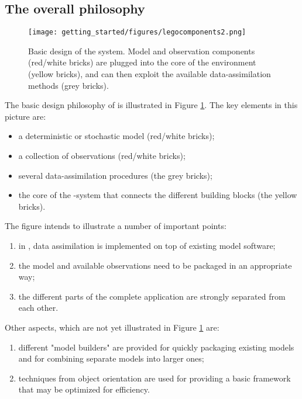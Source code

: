 \subsection{The overall philosophy}

\begin{figure}[ht]
\center
\texttt{[image: getting\_started/figures/legocomponents2.png]}
\caption{Basic design of the \oda system. Model and observation components (red/white bricks) are plugged into the core of the \oda environment (yellow bricks), and can then exploit the available data-assimilation methods (grey bricks).}
\label{fig:legoblocks}
\end{figure}

The basic design philosophy of \oda is illustrated in Figure \ref{fig:legoblocks}. The key elements in this picture are:

\begin{itemize}
\item a deterministic or stochastic model (red/white bricks);
\item a collection of observations (red/white bricks);
\item several data-assimilation procedures (the grey bricks);
\item the core of the \oda-system that connects the different building blocks (the yellow bricks).
\end{itemize}

The figure intends to illustrate a number of important points:

\begin{enumerate}
\item in \oda, data assimilation is implemented on top of existing model software;
\item the model and available observations need to be packaged in an appropriate way;
\item the different parts of the complete application are strongly separated from each other.
\end{enumerate}
    

Other aspects, which are not yet illustrated in Figure \ref{fig:legoblocks} are:

\begin{enumerate}
\item different "model builders" are provided for quickly packaging existing models and for combining separate models into larger ones;
\item techniques from object orientation are used for providing a basic framework that may be optimized for efficiency.
\end{enumerate}

